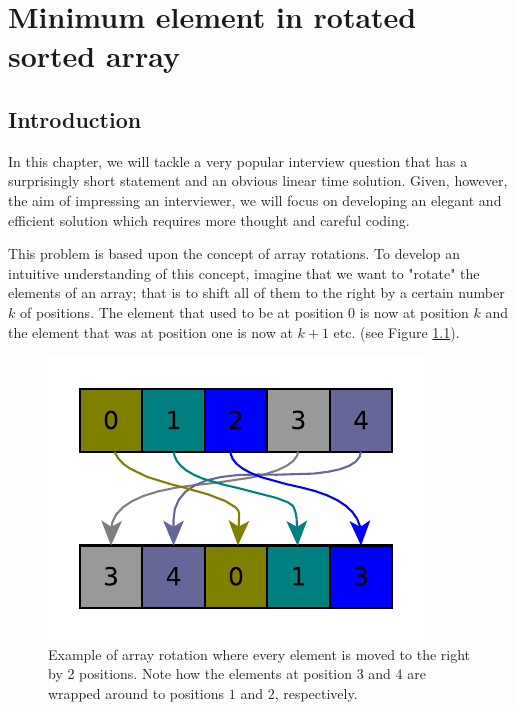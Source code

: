 %

\chapter{Minimum element in rotated sorted array}
\label{ch:min_rotated_array}
\section*{Introduction}
In this chapter, we will tackle a very popular interview question that has a surprisingly short statement and an obvious linear time solution. Given, however, the aim of impressing an interviewer, we will focus on developing an elegant and efficient solution which requires more thought and careful coding.

This problem is based upon the concept of array rotations. To develop an intuitive understanding of this concept, imagine that we want to "rotate" the elements of an array; that is to shift all of them to the right by a certain number $k$ of positions. The element that used to be at position $0$ is now at position $k$ and the element that was at position one is now at $k+1$ etc. (see Figure \ref{fig:min_rotated_array:arrayrotation}).

\begin{figure}
	\centering
	\includegraphics{sources/min_rotated_array/images/arrayrotation}
	\caption{Example of array rotation where every element is moved to the right by 2 positions. Note how  the elements at position $3$ and $4$ are wrapped around to positions $1$ and $2$, respectively.}
	\label{fig:min_rotated_array:arrayrotation}
\end{figure}



